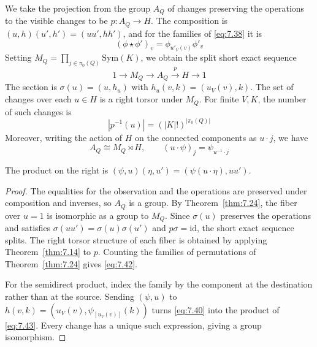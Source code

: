 \begin{theorem}\label{thm:7.25}

We take the projection from the group $A_Q$ of changes preserving the operations to the
visible changes to be $p:A_Q\to H$.
The composition is $(u,h)(u',h')=(uu',hh')$, and for the families of \eqref{eq:7.38} it is
\begin{equation*}
(\phi\star\phi')_v=\phi_{u'_V(v)}\phi'_v
\tag{7.40}\label{eq:7.40}
\end{equation*}
Setting $M_Q=\prod_{j\in\pi_0(Q)}\mathrm{Sym}(K)$, we obtain the split short exact sequence
\begin{equation*}
1\longrightarrow M_Q\longrightarrow A_Q
\xrightarrow{p}H\longrightarrow1
\tag{7.41}\label{eq:7.41}
\end{equation*}
The section is $\sigma(u)=(u,h_u)$ with $h_u(v,k)=(u_V(v),k)$.
The set of changes over each $u\in H$ is a right torsor under $M_Q$.
For finite $V,K$, the number of such changes is
\begin{equation*}
|p^{-1}(u)|=(|K|!)^{|\pi_0(Q)|}
\tag{7.42}\label{eq:7.42}
\end{equation*}
Moreover, writing the action of $H$ on the connected components as $u\cdot j$, we have
\begin{equation*}
A_Q\cong M_Q\rtimes H,\qquad
(u\cdot\psi)_j=\psi_{u^{-1}\cdot j}
\tag{7.43}\label{eq:7.43}
\end{equation*}

The product on the right is $(\psi,u)(\eta,u')=(\psi(u\cdot\eta),uu')$.

\end{theorem}

\begin{proof}

The equalities for the observation and the operations are preserved under composition and
inverses, so $A_Q$ is a group.
By Theorem~\ref{thm:7.24}, the fiber over $u=1$ is isomorphic as a group to $M_Q$.
Since $\sigma(u)$ preserves the operations and satisfies $\sigma(uu')=\sigma(u)\sigma(u')$
and $p\sigma=\mathrm{id}$, the short exact sequence splits.
The right torsor structure of each fiber is obtained by applying Theorem~\ref{thm:7.14} to
$p$.
Counting the families of permutations of Theorem~\ref{thm:7.24} gives \eqref{eq:7.42}.

For the semidirect product, index the family by the component at the destination
rather than at the source. Sending $(\psi,u)$ to
$h(v,k)=(u_V(v),\psi_{[u_V(v)]}(k))$ turns \eqref{eq:7.40} into the product
of \eqref{eq:7.43}. Every change has a unique such expression, giving a group isomorphism.

\end{proof}


